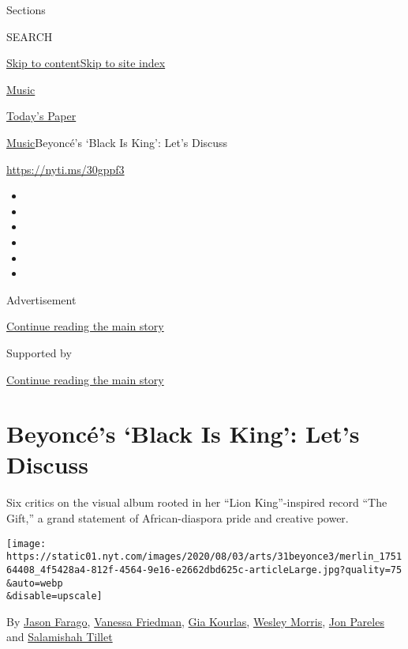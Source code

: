 Sections

SEARCH

\protect\hyperlink{site-content}{Skip to
content}\protect\hyperlink{site-index}{Skip to site index}

\href{https://www.nytimes.com/section/arts/music}{Music}

\href{https://myaccount.nytimes.com/auth/login?response_type=cookie\&client_id=vi}{}

\href{https://www.nytimes.com/section/todayspaper}{Today's Paper}

\href{/section/arts/music}{Music}\textbar{}Beyoncé's `Black Is King':
Let's Discuss

\url{https://nyti.ms/30gppf3}

\begin{itemize}
\item
\item
\item
\item
\item
\item
\end{itemize}

Advertisement

\protect\hyperlink{after-top}{Continue reading the main story}

Supported by

\protect\hyperlink{after-sponsor}{Continue reading the main story}

\hypertarget{beyoncuxe9s-black-is-king-lets-discuss}{%
\section{Beyoncé's `Black Is King': Let's
Discuss}\label{beyoncuxe9s-black-is-king-lets-discuss}}

Six critics on the visual album rooted in her ``Lion King''-inspired
record ``The Gift,'' a grand statement of African-diaspora pride and
creative power.

\texttt{[image: https://static01.nyt.com/images/2020/08/03/arts/31beyonce3/merlin\_175164408\_4f5428a4-812f-4564-9e16-e2662dbd625c-articleLarge.jpg?quality=75\\\&auto=webp\\\&disable=upscale]}

By \href{https://www.nytimes.com/by/jason-farago}{Jason Farago},
\href{https://www.nytimes.com/by/vanessa-friedman}{Vanessa Friedman},
\href{https://www.nytimes.com/by/gia-kourlas}{Gia Kourlas},
\href{https://www.nytimes.com/by/wesley-morris}{Wesley Morris},
\href{https://www.nytimes.com/by/jon-pareles}{Jon Pareles} and
\href{https://www.nytimes.com/by/salamishah-tillet}{Salamishah Tillet}

